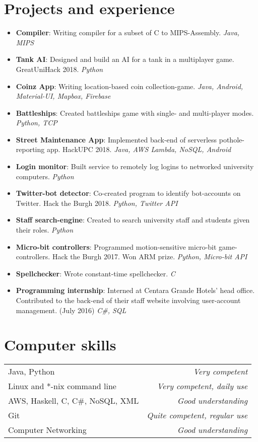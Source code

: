 \documentclass[11pt,a4paper]{article}
\begin{document}
\section*{Projects and experience}
\begin{itemize}
    \item \textbf{Compiler}:
        Writing compiler for a subset of C to MIPS-Assembly.
        \textit{Java, MIPS}
    \item \textbf{Tank AI}:
        Designed and build an AI for a tank in a multiplayer game. GreatUniHack 2018.
        \textit{Python}
    \item \textbf{Coinz App}:
        Writing location-based coin collection-game.
        \textit{Java, Android, Material-UI, Mapbox, Firebase}
    \item \textbf{Battleships}:
        Created battleships game with single- and multi-player modes.
        \textit{Python, TCP}
    \item \textbf{Street Maintenance App}:
        Implemented back-end of serverless pothole-reporting app. HackUPC 2018.
        \textit{Java, AWS Lambda, NoSQL, Android}
    \item \textbf{Login monitor}:
        Built service to remotely log logins to networked university computers.
        \textit{Python}
    \item \textbf{Twitter-bot detector}:
        Co-created program to identify bot-accounts on Twitter. Hack the Burgh 2018.
        \textit{Python, Twitter API}
    \item \textbf{Staff search-engine}:
        Created to search university staff and students given their roles.
        \textit{Python}
    \item \textbf{Micro-bit controllers}:
        Programmed motion-sensitive micro-bit game-controllers. Hack the Burgh 2017.
        Won ARM prize.
        \textit{Python, Micro-bit API}
    \item \textbf{Spellchecker}:
        Wrote constant-time spellchecker.
        \textit{C}
    \item \textbf{Programming internship}:
        Interned at Centara Grande Hotels' head office.
        Contributed to the back-end of their staff website involving user-account management.
        (July 2016)
        \textit{C\#, SQL} 
\end{itemize}

\hline
\section*{Computer skills}
\begin{tabularx}{\textwidth}{X r}
    Java, Python & \textit{Very competent} \\
    Linux and *-nix command line & \textit{Very competent, daily use} \\
    AWS, Haskell, C, C\#, NoSQL, XML & \textit{Good understanding} \\
    Git & \textit{Quite competent, regular use} \\
    Computer Networking & \textit{Good understanding}
\end{tabularx}
\end{document}
